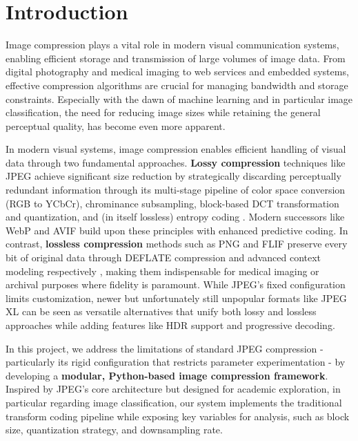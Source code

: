 \section{Introduction}
\label{sec:intro}

Image compression plays a vital role in modern visual communication systems, enabling efficient storage and transmission of large volumes of image data. From digital photography and medical imaging to web services and embedded systems, effective compression algorithms are crucial for managing bandwidth and storage constraints. Especially with the dawn of machine learning and in particular image classification, the need for reducing image sizes while retaining the general perceptual quality, has become even more apparent.

In modern visual systems, image compression enables efficient handling of visual data through two fundamental approaches. \textbf{Lossy compression} techniques like JPEG achieve significant size reduction by strategically discarding perceptually redundant information through its multi-stage pipeline of color space conversion (RGB to YCbCr), chrominance subsampling, block-based DCT transformation and quantization, and (in itself lossless) entropy coding \cite{haines1992compression,jpegOverview2025}. Modern successors like WebP and AVIF build upon these principles with enhanced predictive coding. In contrast, \textbf{lossless compression} methods such as PNG and FLIF preserve every bit of original data through DEFLATE compression and advanced context modeling respectively \cite{flif2016}, making them indispensable for medical imaging or archival purposes where fidelity is paramount. While JPEG's fixed configuration limits customization, newer but unfortunately still unpopular formats like JPEG XL \cite{jpegxl} can be seen as versatile alternatives that unify both lossy and lossless approaches while adding features like HDR support and progressive decoding.

\noindent In this project, we address the limitations of standard JPEG compression - particularly its rigid configuration that restricts parameter experimentation - by developing a \textbf{modular, Python-based image compression framework}. Inspired by JPEG's core architecture but designed for academic exploration, in particular regarding image classification, our system implements the traditional transform coding pipeline while exposing key variables for analysis, such as block size, quantization strategy, and downsampling rate. 

